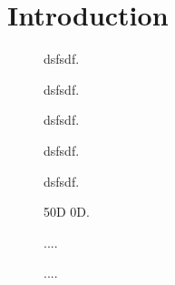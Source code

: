 \section{Introduction}
\lipsum[5]

\begin{figure}[h]
	\centering
    
	\caption{dsfsdf.}
	\label{fig:bat_discharge}
\end{figure}

\begin{figure}[h]
	\centering
    
	\caption{dsfsdf.}
	\label{fig:bat_discharge}
\end{figure}

\begin{figure}[h]
	\centering
    
	\caption{dsfsdf.}
	\label{fig:controllerboardv2_startup}
\end{figure}

\begin{figure}[h]
	\centering
    
	\caption{dsfsdf.}
	\label{fig:controllerboardv2_shutdown}
\end{figure}

\begin{figure}[h]
	\centering
    
	\caption{dsfsdf.}
	\label{fig:controllerboardv2_inrushcurrent_charge}
\end{figure}

\begin{figure}[h]
	\centering
    
	\caption{50D 0D.}
	\label{fig:controllerboardv2_}
\end{figure}

\begin{figure}[h]
	\centering
    
	\caption{....}
	\label{fig:controllerboardv2_}
\end{figure}


\begin{figure}[h]
	\centering
    
	\caption{....}
	\label{fig:controllerboardv2_}
\end{figure}
